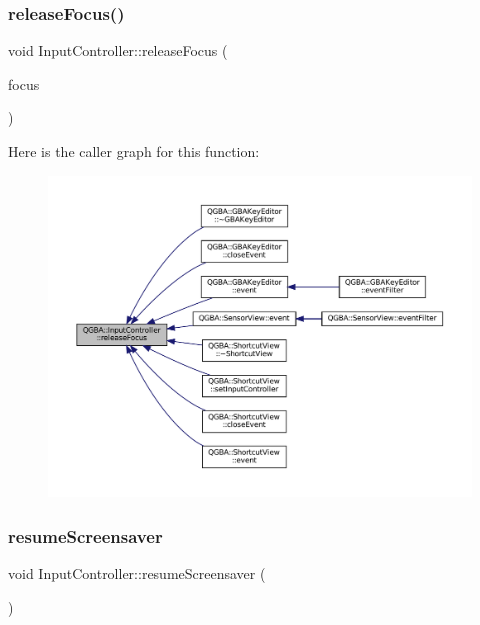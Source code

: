 \subsubsection{\texorpdfstring{release\+Focus()}{releaseFocus()}}
{\footnotesize\ttfamily void Input\+Controller\+::release\+Focus (\begin{DoxyParamCaption}\item[{Q\+Widget $\ast$}]{focus }\end{DoxyParamCaption})}

Here is the caller graph for this function\+:
\nopagebreak
\begin{figure}[H]
\begin{center}
\leavevmode
\includegraphics[width=350pt]{class_q_g_b_a_1_1_input_controller_a45623e9ffa5626156b6f581de78f082f_icgraph}
\end{center}
\end{figure}
\mbox{\label{class_q_g_b_a_1_1_input_controller_afc0f0a7619fca7bb6a7afa073c7fb19a}} 
\subsubsection{\texorpdfstring{resume\+Screensaver}{resumeScreensaver}}
{\footnotesize\ttfamily void Input\+Controller\+::resume\+Screensaver (\begin{DoxyParamCaption}{ }\end{DoxyParamCaption})\hspace{0.3cm}{\ttfamily [slot]}}

